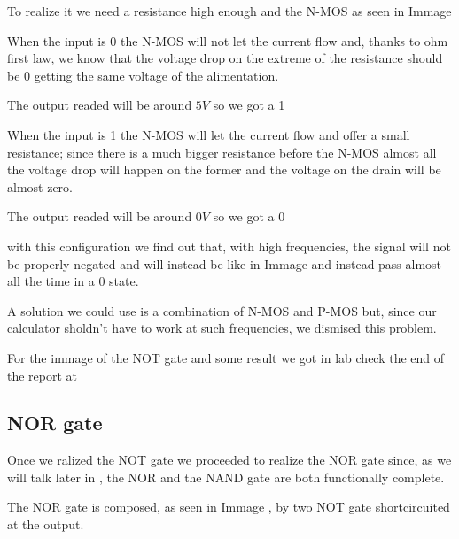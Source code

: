 \documentclass{article}
\begin{document}
To realize it we need a resistance high enough and the N-MOS as seen in Immage%


\vspace{3mm} %

When the input is 0 the N-MOS will not let the current flow and, thanks to ohm first law, we know that the voltage drop on the extreme of the resistance should be 0 getting the same voltage of the alimentation. 

The output readed  will be around $5V$ so we got a 1

When the input is 1 the N-MOS will let the current flow and offer a small resistance; since there is a much bigger resistance before the N-MOS almost all the voltage drop will happen on the former and the voltage on the drain will be almost zero.

The output readed will be around $0V$ so we got a 0

\vspace{3mm}

with this configuration we find out that, with high frequencies, the signal will not be properly negated and will instead be like in Immage%
and instead pass almost all the time in a 0 state. 

A solution we could use is a combination of N-MOS and P-MOS but, since our calculator sholdn't have to work at such frequencies, we dismised this problem.

\vspace{3mm}

For the immage of the NOT gate and some result we got in lab check the end of the report at %



\subsection{NOR gate}

Once we ralized the NOT gate we proceeded to realize the NOR gate since, as we will talk later in %
, the NOR and the NAND gate are both functionally complete.

The NOR gate is composed, as seen in Immage%
, by two NOT gate shortcircuited at the output.

\end{document}
